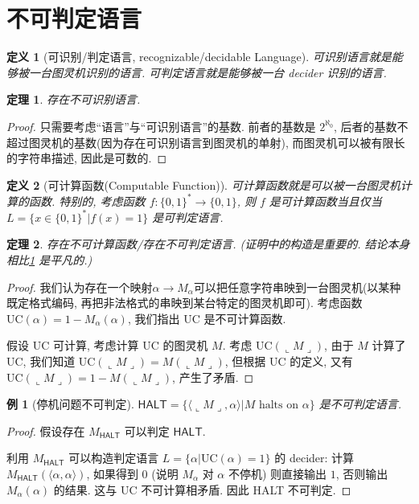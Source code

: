 \documentclass[8pt]{article}
\theoremstyle{compact}
\newtheorem{theorem}{定理}[section]
\newtheorem{definition}{定义}[section]
\newtheorem{example}{例}[section]
\def\rep#1{\llcorner{#1}\lrcorner}
\begin{document}
\section{不可判定语言}
\begin{definition}[可识别/判定语言, recognizable/decidable Language]
	可识别语言就是能够被一台图灵机识别的语言. 可判定语言就是能够被一台 decider 识别的语言.
\end{definition}
\begin{theorem}
	存在不可识别语言.
	\label{unrecognize_exists}
\end{theorem}
\begin{proof}
	只需要考虑“语言”与“可识别语言”的基数. 前者的基数是 $2^{\aleph_0}$, 后者的基数不超过图灵机的基数(因为存在可识别语言到图灵机的单射), 而图灵机可以被有限长的字符串描述, 因此是可数的.
\end{proof}
\begin{definition}[可计算函数(Computable Function)]
	可计算函数就是可以被一台图灵机计算的函数. 特别的, 考虑函数 $f: \{0, 1\}^* \to \{0, 1\}$, 则 $f$ 是可计算函数当且仅当 $L = \{x \in \{0, 1\}^*| f(x) = 1\}$ 是可判定语言.
\end{definition}
\begin{theorem}
	存在不可计算函数/存在不可判定语言. (证明中的构造是重要的. 结论本身相比\cref{unrecognize_exists} 是平凡的.)
\end{theorem}
\begin{proof}
	我们认为存在一个映射$\alpha \to M_{\alpha}$可以把任意字符串映到一台图灵机(以某种既定格式编码, 再把非法格式的串映到某台特定的图灵机即可). 考虑函数 $\text{UC}(\alpha) = 1 - M_{\alpha}(\alpha)$, 我们指出 $\text{UC}$ 是不可计算函数.

	假设 $\text{UC}$ 可计算, 考虑计算 $\text{UC}$ 的图灵机 $M$. 考虑 $\text{UC}(\rep{M})$, 由于 $M$ 计算了 $\text{UC}$, 我们知道 $\text{UC}(\rep{M}) = M(\rep M)$, 但根据 $\text{UC}$ 的定义, 又有 $\text{UC}(\rep M) = 1 - M(\rep M)$, 产生了矛盾.
\end{proof}
\begin{example}[停机问题不可判定]
	$\textsf{HALT} = \{\langle \rep M, \alpha \rangle | M \text{ halts on } \alpha\}$ 是不可判定语言.
\end{example}
\begin{proof}
	假设存在 $M_{\textsf{HALT}}$ 可以判定 $\textsf{HALT}$.
	
	利用 $M_{\textsf{HALT}}$ 可以构造判定语言 $L = \{\alpha | \text{UC}(\alpha) = 1\}$ 的 decider: 计算 $M_{\textsf{HALT}}(\langle \alpha, \alpha \rangle)$, 如果得到 $0$ (说明 $M_{\alpha}$ 对 $\alpha$ 不停机) 则直接输出 $1$, 否则输出$M_{\alpha}(\alpha)$ 的结果. 这与 $\text{UC}$ 不可计算相矛盾. 因此 \textsf{HALT} 不可判定.
\end{proof}
\end{document}
